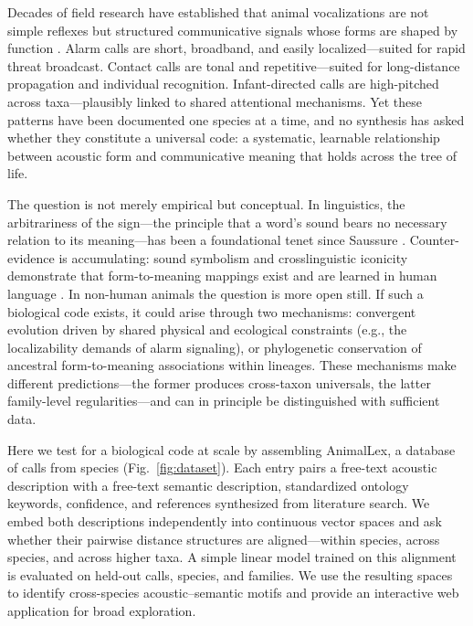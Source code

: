 \documentclass[external]{esp-paper}
\newcommand{\dbname}{AnimalLex\xspace}
\begin{document}
Decades of field research have established that animal vocalizations are not simple reflexes but structured communicative signals whose forms are shaped by function \cite{marler1955characteristics}. Alarm calls are short, broadband, and easily localized---suited for rapid threat broadcast. Contact calls are tonal and repetitive---suited for long-distance propagation and individual recognition. Infant-directed calls are high-pitched across taxa---plausibly linked to shared attentional mechanisms. Yet these patterns have been documented one species at a time, and no synthesis has asked whether they constitute a universal code: a systematic, learnable relationship between acoustic form and communicative meaning that holds across the tree of life.

The question is not merely empirical but conceptual. In linguistics, the arbitrariness of the sign---the principle that a word's sound bears no necessary relation to its meaning---has been a foundational tenet since Saussure \cite{saussure1916}. Counter-evidence is accumulating: sound symbolism and crosslinguistic iconicity demonstrate that form-to-meaning mappings exist and are learned in human language \cite{dingemanse2015arbitrariness}. In non-human animals the question is more open still. If such a biological code exists, it could arise through two mechanisms: convergent evolution driven by shared physical and ecological constraints (e.g., the localizability demands of alarm signaling), or phylogenetic conservation of ancestral form-to-meaning associations within lineages. These mechanisms make different predictions---the former produces cross-taxon universals, the latter family-level regularities---and can in principle be distinguished with sufficient data.

Here we test for a biological code at scale by assembling \dbname, a database of \ncalls calls from \nspecies species (Fig.~\ref{fig:dataset}). Each entry pairs a free-text acoustic description with a free-text semantic description, standardized ontology keywords, confidence, and references synthesized from literature search. We embed both descriptions independently into continuous vector spaces and ask whether their pairwise distance structures are aligned---within species, across species, and across higher taxa. A simple linear model trained on this alignment is evaluated on held-out calls, species, and families. We use the resulting spaces to identify cross-species acoustic--semantic motifs and provide an interactive web application for broad exploration.
\end{document}
